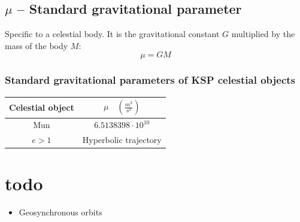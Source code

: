 \documentclass{article}
\begin{document}
\subsection{$\mu$ -- Standard gravitational parameter}

Specific to a celestial body. It is the gravitational constant $G$ multiplied by the mass of the body $M$:
\[
\mu = GM
\]

\subsubsection{Standard gravitational parameters of KSP celestial objects}

\begin{center}
    {\renewcommand{\arraystretch}{1.5}
    \begin{longtable}{ |c|c| } 
        \hline
        Celestial object & $\mu \quad (\frac{m^3}{s^2})$ \\
        \hline
        Mun & $6.5138398 \cdot 10^{10}$ \\
        $e > 1$ & Hyperbolic trajectory \\ 
        \hline
    \end{longtable}
    }
\end{center}

\section{todo}

\begin{itemize}
    \item Geosynchronous orbits \cite{kspwiki:geosyncmath}
\end{itemize}



\printbibliography[heading=bibnumbered]
\end{document}
